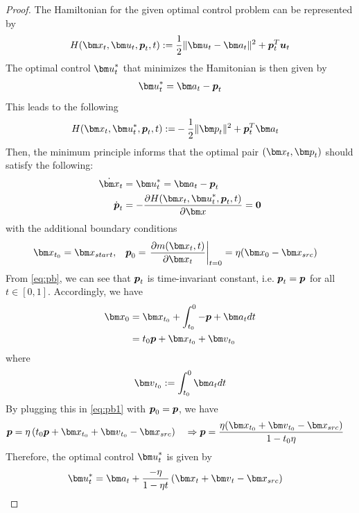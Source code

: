 \begin{proof}
The Hamiltonian for the given optimal control problem can be represented by
\begin{align}
H(\vx_t,\vu_t,\pb_t,t):=  \frac{1}{2}\|\vu_t-\va_t \|^2  + \pb_t^T\ub_t
\end{align}
The optimal control $\vu_t^*$ that minimizes the Hamitonian is then given by
\begin{align}
\vu_t^*=\va_t-\pb_t
\end{align}
This leads to the following
\begin{align}
H(\vx_t,\vu^*_t,\pb_t,t) := & -\frac{1}{2}\|\vp_t\|^2+ \pb_t^T\va_t 
\end{align}
Then, the minimum principle \cite{basar2020lecture, fleming2012deterministic} informs that the optimal pair $(\vx_t,\vp_t)$ should satisfy the following:
\begin{align}
\dot \vx_t  &= \vu_t^*=\va_t-\pb_t
 \\
\dot \pb_t &= - \frac{\partial H(\vx_t,\vu^*_t,\pb_t,t) }{\partial \vx} = \mathbf{0} \label{eq:pb}
\end{align}
with the additional boundary conditions
\begin{align}\label{eq:pb1}
\vx_{t_0} = \vx_{start}, &\quad  \pb_0 =  \left. \frac{\partial m(\vx_t,t)}{\partial \vx_t}\right|_{t=0} = \eta (\vx_0 -\vx_{src}) 
\end{align}
From \eqref{eq:pb}, we can see that ${\boldsymbol p}_t$ is time-invariant constant, i.e. ${\boldsymbol p}_t={\boldsymbol p}$ for all $t\in [0,1]$.
Accordingly, we have
\begin{align}
\vx_0 &= \vx_{t_0} + \int_{t_0}^0 -\pb +\va_tdt \\
&= t_0  \pb +  \vx_{t_0} +\vv_{t_0}
\end{align}
where 
\begin{align}
\vv_{t_0}:= \int_{t_0}^0 \va_t  dt 
\end{align}
By plugging this in \eqref{eq:pb1} with ${\boldsymbol p}_0={\boldsymbol p}$, we have
\begin{align*}
\pb = \eta\left(  t_0  \pb +  \vx_{t_0} +\vv_{t_0}-\vx_{src} \right) &\quad \Rightarrow \pb = \frac{\eta(\vx_{t_0} +\vv_{t_0}-\vx_{src})}{1-t_0\eta}
\end{align*}
Therefore, the optimal control  $\vu_t^*$ is given by
\begin{align}
\vu_t^* 
&=  \va_t + \frac{-\eta}{1-\eta t} \left(\vx_{t}+\vv_{t} -\vx_{src} \right) 
\end{align}
\end{proof}

